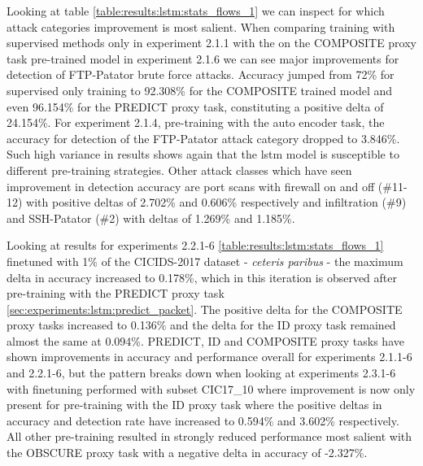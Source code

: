 Looking at table \ref{table:results:lstm:stats_flows_1} we can inspect for which attack categories improvement is most salient. When comparing training with supervised methods only in experiment 2.1.1 with the on the COMPOSITE proxy task pre-trained model in experiment 2.1.6 we can see major improvements for detection of FTP-Patator brute force attacks. Accuracy jumped from 72\% for supervised only training to 92.308\% for the COMPOSITE trained model and even 96.154\% for the PREDICT proxy task, constituting a positive delta of 24.154\%. For experiment 2.1.4, pre-training with the auto encoder task, the accuracy for detection of the FTP-Patator attack category dropped to 3.846\%. Such high variance in results shows again that the \gls{lstm} model is susceptible to different pre-training strategies. Other attack classes which have seen improvement in detection accuracy are port scans with firewall on and off (\#11-12) with positive deltas of 2.702\% and 0.606\% respectively and infiltration (\#9) and SSH-Patator (\#2) with deltas of 1.269\% and 1.185\%. \par





Looking at results for experiments 2.2.1-6 \ref{table:results:lstm:stats_flows_1} finetuned with 1\% of the CICIDS-2017 dataset - \textit{ceteris paribus} - the maximum delta in accuracy increased to 0.178\%, which in this iteration is observed after pre-training with the PREDICT proxy task \ref{sec:experiments:lstm:predict_packet}. The positive delta for the COMPOSITE proxy tasks increased to 0.136\% and the delta for the ID proxy task remained almost the same at 0.094\%. PREDICT, ID and COMPOSITE proxy tasks have shown improvements in accuracy and performance overall for experiments 2.1.1-6 and 2.2.1-6, but the pattern breaks down when looking at experiments 2.3.1-6 with finetuning performed with subset CIC17\_10 where improvement is now only present for pre-training with the ID proxy task where the positive deltas in accuracy and detection rate have increased to 0.594\% and 3.602\% respectively. All other pre-training resulted in strongly reduced performance most salient with the OBSCURE proxy task with a negative delta in accuracy of -2.327\%. \par 



